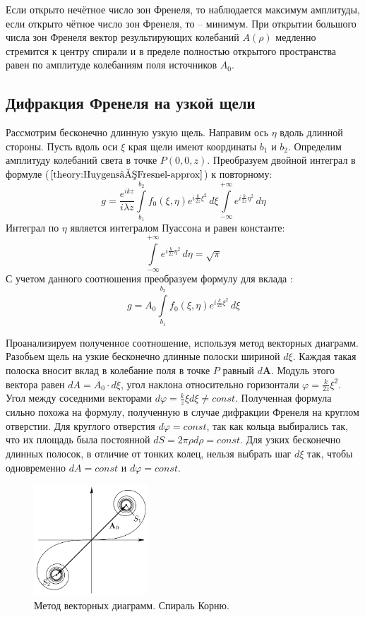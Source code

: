 Если открыто нечётное число зон Френеля, то наблюдается максимум амплитуды, если открыто чётное число зон Френеля, то -- минимум. При открытии большого числа зон Френеля вектор результирующих колебаний $A(\rho)$ медленно стремится к центру спирали и в пределе полностью открытого пространства равен по амплитуде колебаниям поля источников $A_0$.

\subsection*{Дифракция Френеля на узкой щели}

Рассмотрим бесконечно длинную узкую щель. Направим ось $\eta$ вдоль длинной стороны. Пусть вдоль оси $\xi$ края щели имеют координаты $b_1$ и $b_2$. Определим амплитуду колебаний света в точке $P(0, 0, z)$. Преобразуем двойной интеграл в формуле ($\ref{theory:Huygens–Fresnel-approx}$) к повторному:
$$
	g = \frac{e^{ikz}}{i \lambda z} \int \limits_{b_1}^{b_2} f_0(\xi, \eta) e^{i\frac{k}{2z}\xi^2} \, d\xi \int \limits_{-\infty}^{+\infty} e^{i\frac{k}{2z} \eta^2} \, d\eta 
$$
Интеграл по $\eta$ является интегралом Пуассона и равен константе:
$$
	\int \limits_{-\infty}^{+\infty} e^{i\frac{k}{2z} \eta^2} \, d\eta  = \sqrt{\pi}
$$
С учетом данного соотношения преобразуем формулу для вклада :
$$
	g = A_0 \int \limits_{b_1}^{b_2} f_0(\xi, \eta) e^{i\frac{k}{2z}\xi^2} \, d\xi
$$

Проанализируем полученное соотношение, используя метод векторных диаграмм. Разобьем щель на узкие бесконечно длинные полоски шириной $d \xi$. Каждая такая полоска вносит вклад в колебание поля в точке $P$ равный $d \boldsymbol{A}$. Модуль этого вектора равен $d A = A_0 \cdot d \xi$, угол наклона относительно горизонтали $\varphi = \frac{k}{2z} \xi^2$. Угол между соседними векторами $d \varphi = \frac{k}{z} \xi d\xi \neq const$. Полученная формула сильно похожа на формулу, полученную в случае дифракции Френеля на круглом отверстии. Для круглого отверстия $d \varphi = const$, так как кольца выбирались так, что их площадь была постоянной $d S = 2 \pi \rho d \rho = const$. Для узких бесконечно длинных полосок, в отличие от тонких колец, нельзя выбрать шаг $d \xi$ так, чтобы одновременно $dA = const$ и $d \varphi = const$.

\begin{figure}
	\centering
	\includegraphics[width=0.38\textwidth]{../Изображения/Спираль Корню.png}
	\caption{Метод векторных диаграмм. Спираль Корню.}
	\label{img:Cornu-spiral}
\end{figure}

